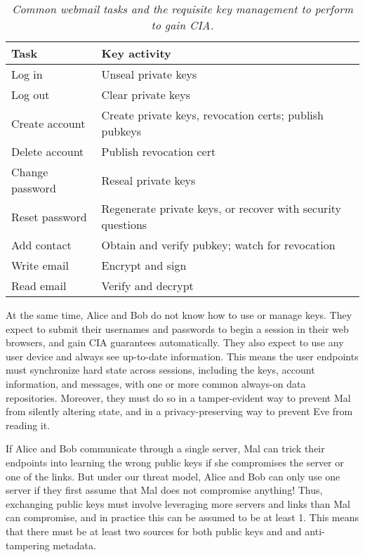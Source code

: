 \begin{table}[ht!]
\begin{tabular}{ | l | L{4.5cm} |}
\hline
\textbf{Task} & \textbf{Key activity} \\
\hline
Log in & Unseal private keys \\
Log out & Clear private keys \\
\hline
Create account & Create private keys, revocation certs; publish pubkeys \\
Delete account & Publish revocation cert \\
Change password & Reseal private keys \\
Reset password & Regenerate private keys, or recover with security questions \\
\hline
Add contact & Obtain and verify pubkey; watch for revocation \\
\hline
Write email & Encrypt and sign \\
Read email & Verify and decrypt \\
\hline
\end{tabular}
\caption{\it Common webmail tasks and the requisite key management to perform to gain CIA.}
\label{tab:user-experience}
\end{table}

At the same time, Alice and Bob do not know how to use or manage keys. 
They expect to submit their usernames and passwords to begin a session 
in their web browsers, and gain CIA guarantees automatically.  They 
also expect to use any user device and always see up-to-date information.  
This means the user endpoints must synchronize hard state across sessions, 
including the keys, account information, and messages, with one or more 
common always-on data repositories.  Moreover, they must do so in a 
tamper-evident way to prevent Mal from silently altering state, and 
in a privacy-preserving way to prevent Eve from reading it.

If Alice and Bob communicate through a single server, Mal can trick 
their endpoints into learning the wrong public keys if she compromises 
the server or one of the links.  But under our threat model, Alice 
and Bob can only use one server if they first assume that Mal does 
not compromise anything!  Thus, exchanging public keys must involve 
leveraging more servers and links than Mal can compromise, and in 
practice this can be assumed to be at least 1.  This means that 
there must be at least two sources for both public keys and and 
anti-tampering metadata.

